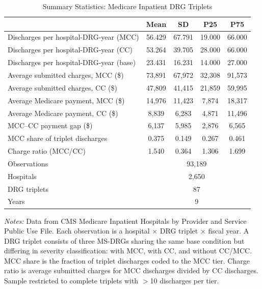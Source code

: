 \begin{table}[htbp]
\centering
\caption{Summary Statistics: Medicare Inpatient DRG Triplets}
\label{tab:sumstats}
\begin{tabular}{lcccc}
\hline\hline
 & Mean & SD & P25 & P75 \\
\hline
Discharges per hospital-DRG-year (MCC) & 56.429 & 67.791 & 19.000 & 66.000 \\
Discharges per hospital-DRG-year (CC) & 53.264 & 39.705 & 28.000 & 66.000 \\
Discharges per hospital-DRG-year (base) & 23.431 & 16.231 & 14.000 & 27.000 \\
Average submitted charges, MCC (\$) & 73,891 & 67,972 & 32,308 & 91,573 \\
Average submitted charges, CC (\$) & 47,809 & 41,415 & 21,859 & 59,995 \\
Average Medicare payment, MCC (\$) & 14,976 & 11,423 & 7,874 & 18,317 \\
Average Medicare payment, CC (\$) & 8,839 & 6,283 & 4,871 & 11,496 \\
MCC--CC payment gap (\$) & 6,137 & 5,985 & 2,876 & 6,565 \\
MCC share of triplet discharges & 0.375 & 0.149 & 0.267 & 0.461 \\
Charge ratio (MCC/CC) & 1.540 & 0.364 & 1.306 & 1.699 \\
\hline
Observations & \multicolumn{4}{c}{93,189} \\
Hospitals & \multicolumn{4}{c}{2,650} \\
DRG triplets & \multicolumn{4}{c}{87} \\
Years & \multicolumn{4}{c}{9} \\
\hline\hline
\end{tabular}
\begin{tablenotes}[flushleft]\small
\item \textit{Notes:} Data from CMS Medicare Inpatient Hospitals by Provider and Service Public Use File. Each observation is a hospital $\times$ DRG triplet $\times$ fiscal year. A DRG triplet consists of three MS-DRGs sharing the same base condition but differing in severity classification: with MCC, with CC, and without CC/MCC. MCC share is the fraction of triplet discharges coded to the MCC tier. Charge ratio is average submitted charges for MCC discharges divided by CC discharges. Sample restricted to complete triplets with $>$10 discharges per tier.
\end{tablenotes}
\end{table}

